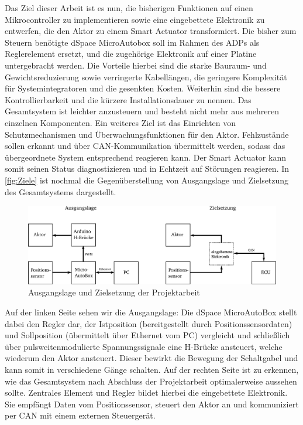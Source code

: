Das Ziel dieser Arbeit ist es nun, die bisherigen Funktionen auf einen Mikrocontroller zu implementieren sowie eine eingebettete Elektronik zu entwerfen, die den Aktor zu einem Smart Actuator transformiert. Die bisher zum Steuern benötigte dSpace MicroAutobox soll im Rahmen des ADPs als Reglerelement ersetzt, und die zugehörige Elektronik auf einer Platine untergebracht werden. Die Vorteile hierbei sind die starke Bauraum- und Gewichtsreduzierung sowie verringerte Kabellängen, die geringere Komplexität für Systemintegratoren und die gesenkten Kosten. Weiterhin sind die bessere Kontrollierbarkeit und die kürzere Installationsdauer zu nennen. Das Gesamtsystem ist leichter anzusteuern und besteht nicht mehr aus mehreren einzelnen Komponenten. Ein weiteres Ziel ist das Einrichten von Schutzmechanismen und Überwachungsfunktionen für den Aktor. Fehlzustände sollen erkannt und über CAN-Kommunikation übermittelt werden, sodass das übergeordnete System entsprechend reagieren kann. Der Smart Actuator kann somit seinen Status diagnostizieren und in Echtzeit auf Störungen reagieren. 
In \autoref{fig:Ziele} ist nochmal die Gegenüberstellung von Ausgangslage und Zielsetzung des Gesamtsystems dargestellt. 
\begin{figure}[H]%
\centering
\includegraphics[width=0.9\columnwidth]{./Bilder/Ziel}%
\caption{Ausgangslage und Zielsetzung der Projektarbeit}%
\label{fig:Ziele}%
\end{figure} \indent
Auf der linken Seite sehen wir die Ausgangslage:  Die dSpace MicroAutoBox stellt dabei den Regler dar, der Istposition (bereitgestellt durch Positionssensordaten) und Sollposition (übermittelt über Ethernet vom PC) vergleicht und schließlich über pulsweitenmodulierte Spannungssignale eine H-Brücke ansteuert, welche wiederum den Aktor ansteuert. Dieser bewirkt die Bewegung der Schaltgabel und kann somit in verschiedene Gänge schalten. Auf der rechten Seite ist zu erkennen, wie das Gesamtsystem nach Abschluss der Projektarbeit optimalerweise aussehen sollte. Zentrales Element und Regler bildet hierbei die eingebettete Elektronik. Sie empfängt Daten vom Positionssensor, steuert den Aktor an und kommuniziert per CAN mit einem externen Steuergerät.

